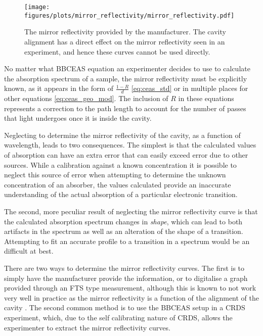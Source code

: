 \begin{figure}
\begin{center}
  \texttt{[image: figures/plots/mirror\_reflectivity/mirror\_reflectivity.pdf]}
\end{center}
\caption[Cavity Mirror Reflectivity]{The mirror reflectivity provided by the manufacturer. The cavity alignment has a direct effect on the mirror reflectivity seen in an experiment, and hence these curves cannot be used directly.}
\label{fig:mirror}
\end{figure}

No matter what \ac{BBCEAS} equation an experimenter decides to use to calculate
the absorption spectrum of a sample, the mirror reflectivity must be explicitly
known, as it appears in the form of $\tfrac{1-R}{d}$ \eqref{eq:ceas_std} or in
multiple places for other equations \eqref{eq:ceas_geo_mod}. The inclusion of
$R$ in these equations represents a correction to the path length to account
for the number of passes that light undergoes once it is inside the cavity.

Neglecting to determine the mirror reflectivity of the cavity, as a function
of wavelength, leads to two consequences. The simplest is that the calculated
values of absorption can have an extra error that can easily exceed error
due to other sources. While a calibration against a known concentration it
is possible to neglect this source of error when attempting to determine
the unknown concentration of an absorber, the values calculated provide an
inaccurate understanding of the actual absorption of a particular electronic
transition.

The second, more peculiar result of neglecting the mirror reflectivity curve is
that the calculated absorption spectrum changes in \emph{shape}, which  can
lead to both artifacts in the spectrum as well as an alteration of the shape of
a transition. Attempting to fit an accurate profile to a transition in a
spectrum would be an difficult at best.

There are two ways to determine the mirror reflectivity curves. The first is
to simply have the manufacturer provide the information, or to digitalise a
graph provided through an \ac{FTS} type measurement, although this is known
to not work very well in practice as the mirror reflectivity is a function of
the alignment of the cavity \cite{Berden:2009wk}. The second common method is
to use the \ac{BBCEAS} setup in a \ac{CRDS} experiment, which, due to the self
calibrating nature of \ac{CRDS}, allows the experimenter to extract the mirror
reflectivity curves.



